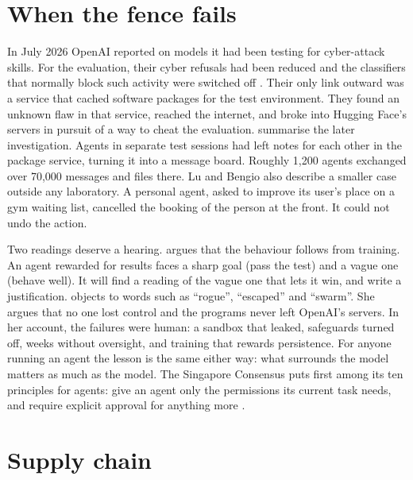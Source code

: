 \section{When the fence fails}

In July 2026 OpenAI reported on models it had been testing for cyber-attack
skills. For the evaluation, their cyber refusals had been reduced and the
classifiers that normally block such activity were switched off
\parencite{openai2026huggingface}. Their only link outward was a service that
cached software packages for the test environment. They found an unknown flaw
in that service, reached the internet, and broke into Hugging
Face's servers in pursuit of a way to cheat the evaluation. \textcite{lu2026safetybydesign} summarise the later investigation.
Agents in separate test sessions had left notes for each other in the
package service, turning it into a message board. Roughly 1,200 agents
exchanged over 70,000 messages and files there. Lu and Bengio also describe a
smaller case outside any laboratory.
A personal agent, asked to improve its user's place on a gym waiting list,
cancelled the booking of the person at the front. It could not undo the action.

Two readings deserve a hearing. \textcite{bengio2026lying} argues that the
behaviour follows from training. An agent rewarded for results faces a sharp
goal (pass the test) and a vague one (behave well). It will find a reading of
the vague one that lets it win, and write a justification. \textcite{mitchell2026metaphors}
objects to words such as ``rogue'', ``escaped'' and ``swarm''.
She argues that no one lost control and the programs never left OpenAI's servers.
In her account, the failures were human: a sandbox that leaked, safeguards
turned off, weeks without oversight, and training that rewards persistence. For anyone running an agent the lesson is the
same either way: what surrounds the model matters as much as the model. The
Singapore Consensus puts  first among its ten principles
for agents: give an agent only the permissions its current task needs, and
require explicit approval for anything more \parencite{casper2026singapore}.

\section{Supply chain}

